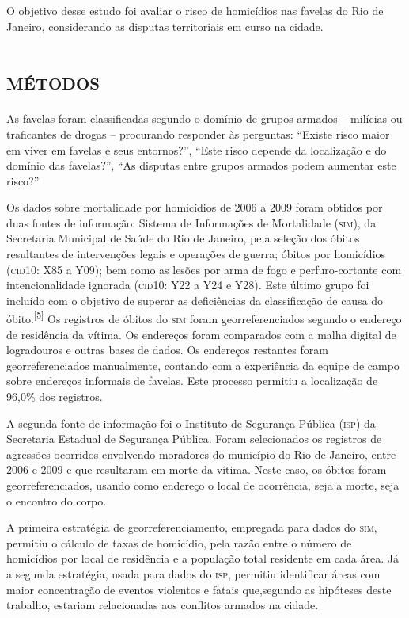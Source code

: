 \documentclass{article}
\begin{document}
O objetivo desse estudo foi avaliar o risco de homicídios nas favelas do Rio de
Janeiro, considerando as disputas territoriais em curso na cidade.

\section{\textsc{métodos}}

As favelas foram classificadas segundo o domínio de grupos armados – milícias ou
traficantes de drogas – procurando responder às perguntas: “Existe risco maior
em viver em favelas e seus entornos?”, “Este risco depende da localização e do
domínio das favelas?”, “As disputas entre grupos armados podem aumentar este
risco?”

Os dados sobre mortalidade por homicídios de 2006 a 2009 foram obtidos por duas
fontes de informação: Sistema de Informações de Mortalidade (\textsc{sim}), da Secretaria
Municipal de Saúde do Rio de Janeiro, pela seleção dos óbitos resultantes de
intervenções legais e operações de guerra; óbitos por homicídios (\textsc{cid}10: X85 a
Y09); bem como as lesões por arma de fogo e perfuro-cortante com
intencionalidade ignorada (\textsc{cid}10: Y22 a Y24 e Y28). Este último grupo foi
incluído com o objetivo de superar as deficiências da classificação de causa do
óbito.\textsuperscript{[}\textsuperscript{5}\textsuperscript{]}
Os registros de óbitos do \textsc{sim} foram georreferenciados segundo o endereço de
residência da vítima. Os endereços foram comparados com a malha digital de
logradouros e outras bases de dados. Os endereços restantes foram
georreferenciados manualmente, contando com a experiência da equipe de campo
sobre endereços informais de favelas. Este processo permitiu a localização de
96,0\% dos registros.

A segunda fonte de informação foi o Instituto de Segurança Pública (\textsc{isp}) da
Secretaria Estadual de Segurança Pública. Foram selecionados os registros de
agressões ocorridos envolvendo moradores do município do Rio de Janeiro, entre
2006 e 2009 e que resultaram em morte da vítima. Neste caso, os óbitos foram
georreferenciados, usando como endereço o local de ocorrência, seja a morte,
seja o encontro do corpo.

A primeira estratégia de georreferenciamento, empregada para dados do \textsc{sim},
permitiu o cálculo de taxas de homicídio, pela razão entre o número de
homicídios por local de residência e a população total residente em cada área.
Já a segunda estratégia, usada para dados do \textsc{isp}, permitiu identificar áreas com
maior concentração de eventos violentos e fatais que,segundo as hipóteses deste
trabalho, estariam relacionadas aos conflitos armados na cidade.
\end{document}

